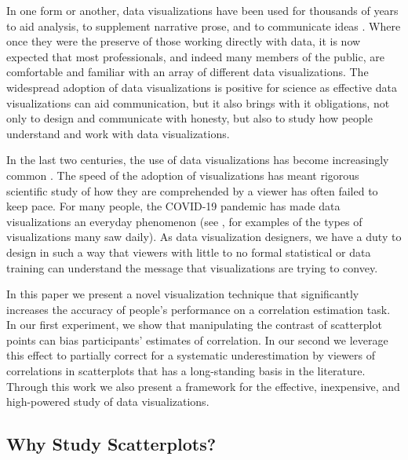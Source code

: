 \documentclass[preprint, 3p,
authoryear]{elsarticle} %
\begin{document}
In one form or another, data visualizations have been used for thousands
of years to aid analysis, to supplement narrative prose, and to
communicate ideas \citep{azzam_2013}. Where once they were the preserve
of those working directly with data, it is now expected that most
professionals, and indeed many members of the public, are comfortable
and familiar with an array of different data visualizations. The
widespread adoption of data visualizations is positive for science as
effective data visualizations can aid communication, but it also brings
with it obligations, not only to design and communicate with honesty,
but also to study how people understand and work with data
visualizations.

In the last two centuries, the use of data visualizations has become
increasingly common \citep{friendly_2005, azzam_2013}. The speed of the
adoption of visualizations has meant rigorous scientific study of how
they are comprehended by a viewer has often failed to keep pace. For
many people, the COVID-19 pandemic has made data visualizations an
everyday phenomenon (see \citealp{bbc_2022}, for examples of the types
of visualizations many saw daily). As data visualization designers, we
have a duty to design in such a way that viewers with little to no
formal statistical or data training can understand the message that
visualizations are trying to convey.

In this paper we present a novel visualization technique that
significantly increases the accuracy of people's performance on a
correlation estimation task. In our first experiment, we show that
manipulating the contrast of scatterplot points can bias participants'
estimates of correlation. In our second we leverage this effect to
partially correct for a systematic underestimation by viewers of
correlations in scatterplots that has a long-standing basis in the
literature. Through this work we also present a framework for the
effective, inexpensive, and high-powered study of data visualizations.

\hypertarget{why-study-scatterplots}{%
\subsection{Why Study Scatterplots?}\label{why-study-scatterplots}}
\end{document}
